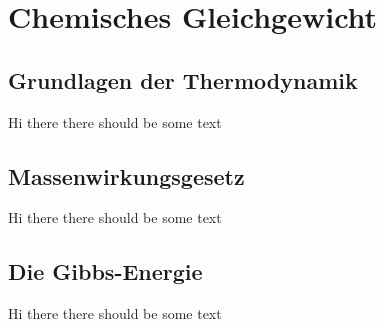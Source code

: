 \section{Chemisches Gleichgewicht}

\subsection{Grundlagen der Thermodynamik}
Hi there there should be some text

\subsection{Massenwirkungsgesetz}

Hi there there should be some text

\subsection{Die Gibbs-Energie}

Hi there there should be some text